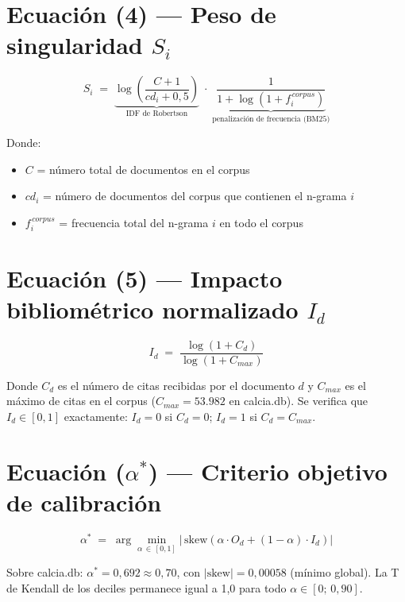 \documentclass[12pt]{article}
\begin{document}
\section*{Ecuación (4) — Peso de singularidad $S_i$}

\begin{equation}
S_i \;=\;
\underbrace{\log\!\left(\frac{C+1}{cd_i + 0{,}5}\right)}_{\text{IDF de Robertson}}
\;\cdot\;
\underbrace{\frac{1}{1 + \log\!\left(1 + f_i^{\,corpus}\right)}}_{\text{penalización de frecuencia (BM25)}}
\label{eq:si}
\end{equation}

\noindent
Donde:
\begin{itemize}
  \item $C$ = número total de documentos en el corpus
  \item $cd_i$ = número de documentos del corpus que contienen el n-grama $i$
  \item $f_i^{\,corpus}$ = frecuencia total del n-grama $i$ en todo el corpus
\end{itemize}

\section*{Ecuación (5) — Impacto bibliométrico normalizado $I_d$}

\begin{equation}
I_d \;=\; \frac{\log(1 + C_d)}{\log(1 + C_{max})}
\label{eq:id}
\end{equation}

\noindent
Donde $C_d$ es el número de citas recibidas por el documento $d$ y
$C_{max}$ es el máximo de citas en el corpus ($C_{max} = 53{.}982$ en calcia.db).
Se verifica que $I_d \in [0,1]$ exactamente: $I_d = 0$ si $C_d = 0$; $I_d = 1$
si $C_d = C_{max}$.

\section*{Ecuación ($\alpha^*$) — Criterio objetivo de calibración}

\begin{equation}
\alpha^* \;=\; \arg\min_{\alpha \,\in\, [0,1]}
\left|\,\mathrm{skew}\!\left(\alpha \cdot O_d + (1-\alpha)\cdot I_d\right)\right|
\label{eq:alpha}
\end{equation}

\noindent
Sobre calcia.db: $\alpha^* = 0{,}692 \approx 0{,}70$, con $|\mathrm{skew}| = 0{,}00058$
(mínimo global). La T de Kendall de los deciles permanece igual a 1,0 para
todo $\alpha \in [0;\, 0{,}90]$.
\end{document}
